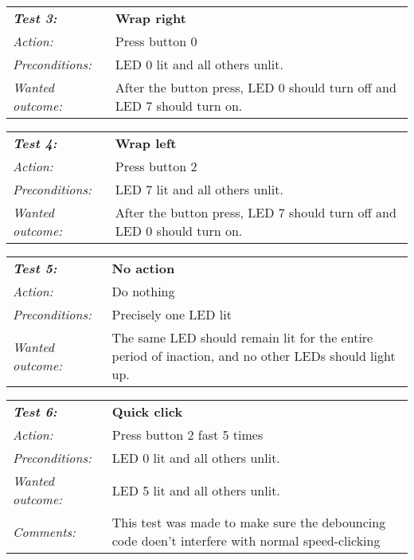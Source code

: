 \vspace{1.0cm}

\begin{tabular}[h]{|lp{12cm}|} \hline
\textbf{\emph{Test 3:}} 		& \textbf{Wrap right}\\
\emph{Action:} 		& Press button 0\\
\emph{Preconditions:}	& LED 0 lit and all others unlit.\\
\emph{Wanted outcome:}	& After the button press, LED 0 should turn off and LED 7 should turn on.\\ \hline
\end{tabular}

\vspace{1cm}

\begin{tabular}[h]{|lp{12cm}|} \hline
\textbf{\emph{Test 4:}} 		& \textbf{Wrap left}\\
\emph{Action:} 		& Press button 2\\
\emph{Preconditions:}	& LED 7 lit and all others unlit.\\
\emph{Wanted outcome:}	& After the button press, LED 7 should turn off and LED 0 should turn on.\\ \hline
\end{tabular}

\vspace{1cm}

\begin{tabular}[h]{|lp{12cm}|} \hline
\textbf{\emph{Test 5:}} 		& \textbf{No action}\\
\emph{Action:} 		& Do nothing\\
\emph{Preconditions:}	& Precisely one LED lit\\
\emph{Wanted outcome:}	& The same LED should remain lit for the entire period of inaction, and no other LEDs should light up.\\ \hline
\end{tabular}

\vspace{1cm}

\begin{tabular}[h]{|lp{12cm}|} \hline
\textbf{\emph{Test 6:}} 		& \textbf{Quick click}\\
\emph{Action:} 		& Press button 2 fast 5 times\\
\emph{Preconditions:}	& LED 0 lit and all others unlit.\\
\emph{Wanted outcome:}	& LED 5 lit and all others unlit.\\
\emph{Comments:}		& This test was made to make sure the debouncing code doen’t interfere with normal speed-clicking \\ \hline
\end{tabular}


